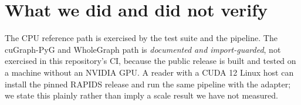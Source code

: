 \section{What we did and did not verify}
The CPU reference path is exercised by the test suite and the pipeline. The cuGraph-PyG and
WholeGraph path is \emph{documented and import-guarded}, not exercised in this repository's CI,
because the public release is built and tested on a machine without an NVIDIA GPU. A reader with
a CUDA 12 Linux host can install the pinned RAPIDS release and run the same pipeline with the
adapter; we state this plainly rather than imply a scale result we have not measured.
